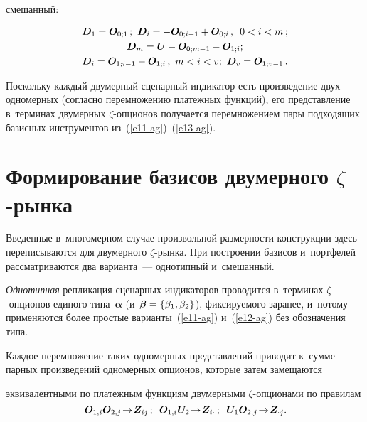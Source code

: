 \begin{multicols}{2}
\vspace*{-3pt}

\noindent
смешанный:

\vspace*{-6pt}

\noindent
\begin{multline}
\boldsymbol{D}_1=\boldsymbol{O}_{0;1}\,;\ \boldsymbol{D}_i=-\boldsymbol{O}_{0;i-1}+\boldsymbol{O}_{0;i}\,,\enskip  0<i<m\,;  \\
  \boldsymbol{D}_m=\boldsymbol{U}-\boldsymbol{O}_{0;m-1}-\boldsymbol{O}_{1;i};
\\
\!\!\boldsymbol{D}_i= \boldsymbol{O}_{1;i-1} -\boldsymbol{O}_{1;i}\,, \ m<i<v;\ \boldsymbol{D}_v=\boldsymbol{O}_{1;v-1}\,.
\!\!\label{e13-ag}
\end{multline}

\vspace*{-3pt}
  
  Поскольку каждый двумерный сценарный индикатор есть произведение двух 
одномерных (согласно перемножению платежных функций), его представление 
в~терминах двумерных $\zeta$-оп\-ци\-о\-нов получается перемножением пары 
подходящих базисных инструментов из~(\ref{e11-ag})--(\ref{e13-ag}). 

  
  \section{Формирование базисов двумерного $\zeta$-рынка}
  
  Введенные в~многомерном случае произвольной размерности конструкции 
здесь переписываются для двумерного $\zeta$-рын\-ка. При построении базисов 
и~портфелей рассматриваются два варианта~--- однотипный и~смешанный.
  
  
  \textit{Однотипная} репликация сценарных индикаторов проводится 
в~терминах  $\zeta$-оп\-ци\-о\-нов единого типа~$\boldsymbol{\alpha}$ 
(и~$\boldsymbol{\beta}\hm= \{\beta_1, \beta_2\}$), фиксируемого заранее, 
и~потому применяются более простые варианты~(\ref{e11-ag}) и~(\ref{e12-ag}) 
без обозначения типа. 
  
  Каждое перемножение таких одномерных представлений приводит к~сумме 
парных произведений одномерных опционов, которые затем замещаются\linebreak\vspace*{-12pt}

\columnbreak

\noindent
 эквивалентными по платежным функциям двумерными  
$\zeta$-оп\-ци\-о\-на\-ми по правилам 
  \begin{equation}
\boldsymbol{O}_{1,i}\boldsymbol{O}_{2,j}\!\to\! \boldsymbol{Z}_{ij}\,;\enskip \boldsymbol{O}_{1,i}\boldsymbol{U}_{2}\!\to\! 
\boldsymbol{Z}_{i\cdot}\,;\enskip \boldsymbol{U}_1\boldsymbol{O}_{2,j}\!\to\! \boldsymbol{Z}_{\cdot j}.\!
  \label{e14-ag}
  \end{equation}
  

\end{multicols}
